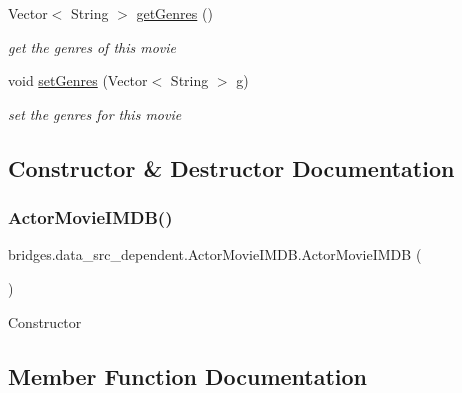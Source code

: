 \begin{DoxyCompactItemize}
Vector$<$ String $>$ \hyperlink{classbridges_1_1data__src__dependent_1_1_actor_movie_i_m_d_b_a5f85b9d06b1023be3d5fc6fc4e0173d0}{get\+Genres} ()
\begin{DoxyCompactList}\small\item\em get the genres of this movie \end{DoxyCompactList}\item 
void \hyperlink{classbridges_1_1data__src__dependent_1_1_actor_movie_i_m_d_b_a52f0162b1e946d8bbcd9106274dc2ad3}{set\+Genres} (Vector$<$ String $>$ g)
\begin{DoxyCompactList}\small\item\em set the genres for this movie \end{DoxyCompactList}\end{DoxyCompactItemize}


\subsection{Constructor \& Destructor Documentation}
\mbox{\label{classbridges_1_1data__src__dependent_1_1_actor_movie_i_m_d_b_a5265e7b8ba0613497fae0f4125882413}} 
\subsubsection{\texorpdfstring{Actor\+Movie\+I\+M\+D\+B()}{ActorMovieIMDB()}}
{\footnotesize\ttfamily bridges.\+data\+\_\+src\+\_\+dependent.\+Actor\+Movie\+I\+M\+D\+B.\+Actor\+Movie\+I\+M\+DB (\begin{DoxyParamCaption}{ }\end{DoxyParamCaption})}

Constructor 

\subsection{Member Function Documentation}
\mbox{\label{classbridges_1_1data__src__dependent_1_1_actor_movie_i_m_d_b_a59c20f1a3e718ba11fefac6818cf67ee}} 
